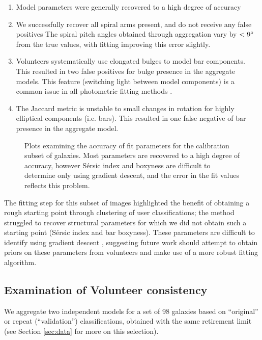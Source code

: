 \documentclass[trackchanges]{aastex63}
\begin{document}
\begin{enumerate}
  \item Model parameters were generally recovered to a high degree of accuracy
  \item We successfully recover all spiral arms present, and do not receive any false positives
The spiral pitch angles obtained through aggregation vary by $< 9\degree$ from the true values, with fitting improving this error slightly.
  \item Volunteers systematically use elongated bulges to model bar components. This resulted in two false positives for bulge presence in the aggregate models. This feature (switching light between model components) is a common issue in all photometric fitting methods \citep{2018MNRAS.473.4731K}.
  \item The Jaccard metric is unstable to small changes in rotation for highly elliptical components (i.e. bars). This resulted in one false negative of bar presence in the aggregate model.
\end{enumerate}

\begin{figure*}
  \caption{Plots examining the accuracy of fit parameters for the calibration subset of galaxies. Most parameters are recovered to a high degree of accuracy, however S\'ersic index and boxyness are difficult to determine only using gradient descent, and the error in the fit values reflects this problem.}
  \label{fig:calibration_parameter_recovery}
\end{figure*}

The fitting step for this subset of images highlighted the benefit of obtaining a rough starting point through clustering of user classifications; the method struggled to recover structural parameters for which we did not obtain such a starting point (S\'ersic index and bar boxyness). These parameters are difficult to identify using gradient descent \citep{2012MNRAS.421.2277L}, suggesting future work should attempt to obtain priors on these parameters from volunteers and make use of a more robust fitting algorithm.

\subsection{Examination of Volunteer consistency}
We aggregate two independent models for a set of 98 galaxies based on ``original'' or repeat (``validation'') classifications, obtained with the same retirement limit (see Section \ref{sec:data} for more on this selection).
\end{document}
